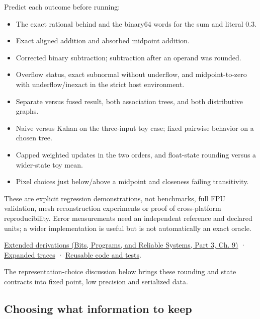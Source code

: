 \hypertarget{01-foundations-i-ch001-laboratory-and-teaching-checkpoint}{}

Predict each outcome before running:

\begin{itemize}
\tightlist
\item
  The exact rational behind  and the binary64 words for the sum and literal 0.3.
\item
  Exact aligned addition and absorbed midpoint addition.
\item
  Corrected binary subtraction; subtraction after an operand was rounded.
\item
  Overflow status, exact subnormal without underflow, and midpoint-to-zero with underflow/inexact in the strict host environment.
\item
  Separate versus fused result, both association trees, and both distributive graphs.
\item
  Naive versus Kahan on the three-input toy case; fixed pairwise behavior on a chosen tree.
\item
  Capped weighted updates in the two orders, and float-state rounding versus a wider-state toy mean.
\item
  Pixel choices just below/above a midpoint and closeness failing transitivity.
\end{itemize}

These are explicit regression demonstrations, not benchmarks, full FPU validation, mesh reconstruction experiments or proof of cross-platform reproducibility. Error measurements need an independent reference and declared units; a wider implementation is useful but is not automatically an exact oracle.

\href{../01-Bits-Programs-and-Reliable-Systems-P03/main.pdf\#01-foundations-i-ch011-m005---representation-error-cancellation-and-rounding-graphs}{Extended derivations (Bits, Programs, and Reliable Systems, Part 3, Ch. 9)} · \hyperref[appendix-92ff77d4dfdc-m005---rounding-paths-and-update-history]{Expanded traces} · \hyperref[appendix-4e2236f53445-m005---strict-arithmetic-and-state-update-laboratory]{Reusable code and tests}.

The representation-choice discussion below brings these rounding and state contracts into fixed point, low precision and serialized data.

\subsection{Choosing what information to keep}\label{01-foundations-i-ch001-choosing-what-information-to-keep}

